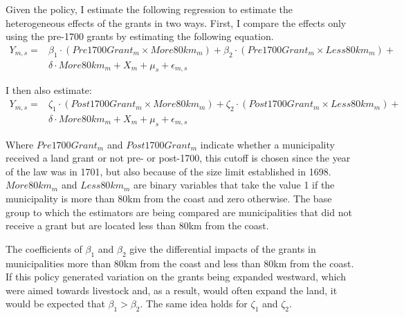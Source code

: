\documentclass[11pt]{article}
\begin{document}


Given the policy, I estimate the following regression to estimate the heterogeneous effects of the grants in two ways. First, I compare the effects only using the pre-1700 grants by estimating the following equation.
\begin{equation}
  \label{eqn:livestock_1600}
  \begin{split}
  Y_{m,s} = & \beta_1 \cdot (Pre1700Grant_m  \times More80km_m) + \beta_2 \cdot (Pre1700Grant_m \times Less80km_m) + \\  
  & \delta \cdot  More80km_m + X_{m} + \mu_s + \epsilon_{m,s}
  \end{split}	
\end{equation}

I then also estimate:
\begin{equation}
  \label{eqn:livestock_1700}
  \begin{split}
  Y_{m,s} = & \zeta_1 \cdot (Post1700Grant_m  \times More80km_m) + \zeta_2 \cdot (Post1700Grant_m \times Less80km_m) + \\ 
  & \delta \cdot  More80km_m + X_{m} + \mu_s + \epsilon_{m,s}
  \end{split}
\end{equation}

Where $Pre1700Grant_m$ and $Post1700Grant_m$ indicate whether a municipality received a land grant or not pre- or post-1700, this cutoff is chosen since the year of the law was in 1701, but also because of the size limit established in 1698. 
$More80km_m$ and $Less80km_m$ are binary variables that take the value 1 if the municipality is more than 80km from the coast and zero otherwise.
The base group to which the estimators are being compared are municipalities that did not receive a grant but are located less than 80km from the coast.

The coefficients of $\beta_1$ and $\beta_2$ give the differential impacts of the grants in municipalities more than 80km from the coast and less than 80km from the coast. 
If this policy generated variation on the grants being expanded westward, which were aimed towards livestock and, as a result, would often expand the land, it would be expected that $\beta_1 > \beta_2$. 
The same idea holds for $\zeta_1$ and $\zeta_2$. 
\end{document}
